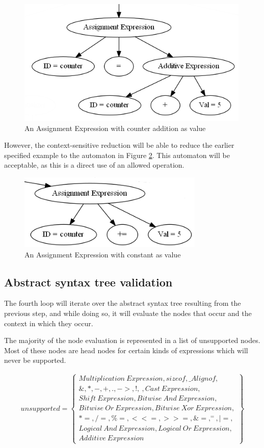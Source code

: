 \documentclass[12pt]{article}
\begin{document}
\begin{figure}[h]
	\centering
	\includegraphics[width=0.6\linewidth]{unfolded_addition}
	\caption{An Assignment Expression with counter addition as value}
	\label{fig:unfolded_addition}
\end{figure}

However, the context-sensitive reduction will be able to reduce the earlier specified example to the automaton in Figure \ref{fig:folded_addition}. This automaton will be acceptable, as this is a direct use of an allowed operation.

\begin{figure}[h]
	\centering
	\includegraphics[width=0.5\linewidth]{folded_addition}
	\caption{An Assignment Expression with constant as value}
	\label{fig:folded_addition}
\end{figure}

\subsection{Abstract syntax tree validation}
The fourth loop will iterate over the abstract syntax tree resulting from the previous step, and while doing so, it will evaluate the nodes that occur and the context in which they occur.

The majority of the node evaluation is represented in a list of unsupported nodes. Most of these nodes are head nodes for certain kinds of expressions which will never be supported.

\begin{align*}
	unsupported = \left\{ \begin{array}{l}
		Multiplication\ Expression, sizeof, \_Alignof, \\
		\&, *, -, +, ., ->, !, ~, Cast\ Expression, \\
		Shift\ Expression, Bitwise\ And\ Expression, \\
		Bitwise\ Or\ Expression, Bitwise\ Xor\ Expression, \\
		*=, /=, \%=, <<=, >>=, \&=, ^=, |=, \\
		Logical\ And\ Expression, Logical\ Or\ Expression, \\
		Additive\ Expression
	\end{array} \right\}
\end{align*}
\end{document}
